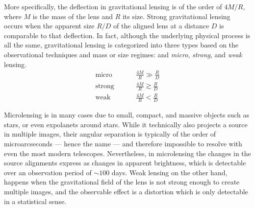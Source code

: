 More specifically, the deflection in gravitational lensing is of the order of
$4M/R$, where $M$ is the mass of the lens and $R$ its size.  Strong
gravitational lensing occurs when the apparent size $R/D$ of the aligned lens at
a distance $D$ is comparable to that deflection.  In fact, although the
underlying physical process is all the same, gravitational lensing is
categorized into three types based on the observational techniques and mass or
size regimes: and \textit{micro}, \textit{strong}, and \textit{weak} lensing.
\begin{equation}
\begin{aligned}
    \text{micro} \hspace{1cm}&\frac{4M}{R} \gg \frac{R}{D}\\
    \text{strong} \hspace{1cm}&\frac{4M}{R} \gtrsim \frac{R}{D}\\
    \text{weak} \hspace{1cm}&\frac{4M}{R} < \frac{R}{D}
\end{aligned}
\end{equation}


Microlensing is in many cases due to small, compact, and massive objects such as
stars, or even expolanets around stars.  While it technically also projects a
source in multiple images, their angular separation is typically of the order of
microarcseconds --- hence the name --- and therefore impossible to resolve with
even the most modern telescopes. Nevertheless, in microlensing the changes in
the source alignments express as changes in apparent brightness, which is
detectable over an observation period of $\sim100$ days.  Weak lensing on the
other hand, happens when the gravitational field of the lens is not strong
enough to create multiple images, and the observable effect is a distortion
which is only detectable in a statistical sense.

